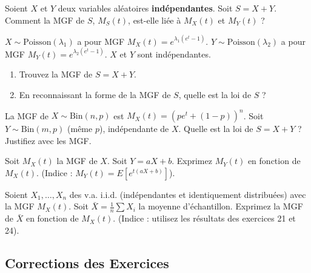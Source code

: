 
\begin{exercicebox}
Soient $X$ et $Y$ deux variables aléatoires \textbf{indépendantes}. Soit $S = X+Y$.
Comment la MGF de $S$, $M_S(t)$, est-elle liée à $M_X(t)$ et $M_Y(t)$ ?
\end{exercicebox}

\begin{exercicebox}
$X \sim \text{Poisson}(\lambda_1)$ a pour MGF $M_X(t) = e^{\lambda_1(e^t - 1)}$.
$Y \sim \text{Poisson}(\lambda_2)$ a pour MGF $M_Y(t) = e^{\lambda_2(e^t - 1)}$.
$X$ et $Y$ sont indépendantes.
\begin{enumerate}
    \item Trouvez la MGF de $S = X+Y$.
    \item En reconnaissant la forme de la MGF de $S$, quelle est la loi de $S$ ?
\end{enumerate}
\end{exercicebox}

\begin{exercicebox}
La MGF de $X \sim \text{Bin}(n, p)$ est $M_X(t) = (p e^t + (1-p))^n$.
Soit $Y \sim \text{Bin}(m, p)$ (même $p$), indépendante de $X$.
Quelle est la loi de $S = X+Y$ ? Justifiez avec les MGF.
\end{exercicebox}

\begin{exercicebox}
Soit $M_X(t)$ la MGF de $X$. Soit $Y = aX + b$.
Exprimez $M_Y(t)$ en fonction de $M_X(t)$.
(Indice : $M_Y(t) = E[e^{t(aX+b)}]$).
\end{exercicebox}

\begin{exercicebox}
Soient $X_1, \dots, X_n$ des v.a. i.i.d. (indépendantes et identiquement distribuées) avec la MGF $M_X(t)$.
Soit $\bar{X} = \frac{1}{n} \sum X_i$ la moyenne d'échantillon.
Exprimez la MGF de $\bar{X}$ en fonction de $M_X(t)$.
(Indice : utilisez les résultats des exercices 21 et 24).
\end{exercicebox}


\subsection{Corrections des Exercices}

